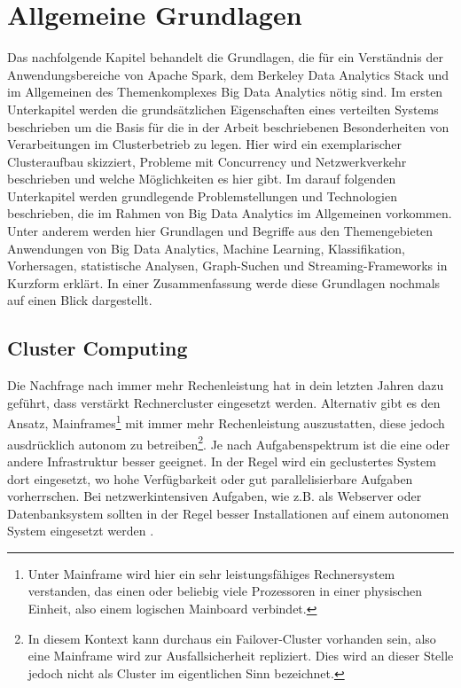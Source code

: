 \chapter{Allgemeine Grundlagen }
\label{chapter:allgemeine Grundlagen}


Das nachfolgende Kapitel behandelt die Grundlagen, die für ein Verständnis der Anwendungsbereiche von Apache Spark, dem Berkeley Data Analytics Stack und im Allgemeinen des Themenkomplexes Big Data Analytics nötig sind. Im ersten Unterkapitel werden die grundsätzlichen Eigenschaften eines verteilten Systems beschrieben um die Basis für die in der Arbeit beschriebenen Besonderheiten von Verarbeitungen im Clusterbetrieb zu legen. Hier wird ein exemplarischer Clusteraufbau skizziert, Probleme mit Concurrency und Netzwerkverkehr beschrieben und welche Möglichkeiten es hier gibt.  Im darauf folgenden Unterkapitel werden grundlegende Problemstellungen und Technologien beschrieben, die im Rahmen von Big Data Analytics im Allgemeinen vorkommen. Unter anderem werden hier Grundlagen und Begriffe aus den Themengebieten Anwendungen von Big Data Analytics, Machine Learning, Klassifikation, Vorhersagen, statistische Analysen, Graph-Suchen und Streaming-Frameworks in Kurzform erklärt. In einer Zusammenfassung werde diese Grundlagen nochmals auf einen Blick dargestellt. 
 

\section{Cluster Computing}
\label{section:cluster computing}

Die Nachfrage nach immer mehr Rechenleistung hat in dein letzten Jahren dazu geführt, dass verstärkt Rechnercluster eingesetzt werden. Alternativ gibt es den Ansatz, Mainframes\footnote{Unter Mainframe wird hier ein sehr leistungsfähiges Rechnersystem verstanden, das einen oder  beliebig viele Prozessoren in einer physischen Einheit, also einem logischen Mainboard verbindet. } mit immer mehr Rechenleistung auszustatten, diese jedoch ausdrücklich autonom zu betreiben\footnote{In diesem Kontext kann durchaus ein Failover-Cluster vorhanden sein, also eine Mainframe wird zur Ausfallsicherheit repliziert. Dies wird an dieser Stelle jedoch nicht als Cluster im eigentlichen Sinn bezeichnet.}. Je nach Aufgabenspektrum ist die eine oder andere Infrastruktur besser geeignet. In der Regel wird ein geclustertes System dort eingesetzt, wo hohe Verfügbarkeit oder gut parallelisierbare Aufgaben vorherrschen. Bei netzwerkintensiven Aufgaben, wie z.B. als Webserver oder Datenbanksystem sollten in der Regel besser Installationen auf einem autonomen System eingesetzt werden .   

